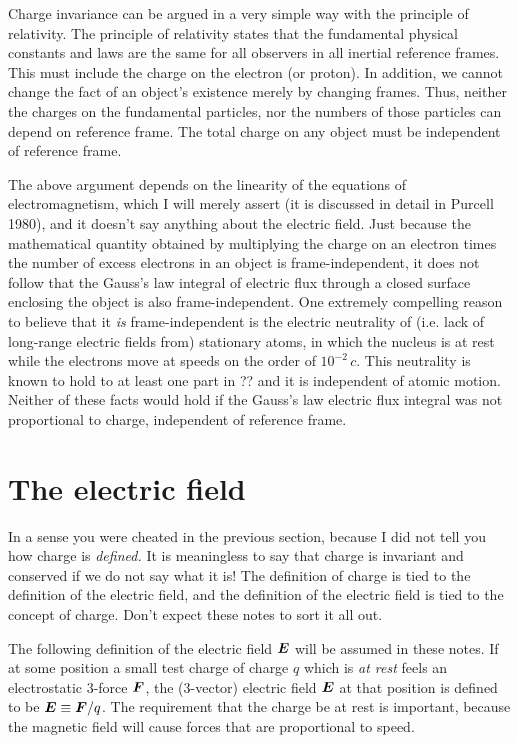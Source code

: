 Charge invariance can be argued in a very simple way with the
principle of relativity.  The principle of relativity states that the
fundamental physical constants and laws are the same for all observers
in all inertial reference frames.  This must include the charge on the
electron (or proton).  In addition, we cannot change the fact of an
object's existence merely by changing frames.  Thus, neither the
charges on the fundamental particles, nor the numbers of those
particles can depend on reference frame.  The total charge on any
object must be independent of reference frame.

The above argument depends on the linearity of the equations of
electromagnetism, which I will merely assert (it is discussed in
detail in Purcell 1980), and it doesn't say anything about the
electric field.  Just because the mathematical quantity obtained by
multiplying the charge on an electron times the number of excess
electrons in an object is frame-independent, it does not follow that
the Gauss's law integral of electric flux through a closed surface
enclosing the object is also frame-independent.  One extremely
compelling reason to believe that it {\em is} frame-independent is the
electric neutrality of (i.e. lack of long-range electric fields from)
stationary atoms, in which the nucleus is at rest while the electrons
move at speeds on the order of $10^{-2}\,c$.  This neutrality is known
to hold to at least one part in ?? and it is independent of atomic
motion.  Neither of these facts would hold if the Gauss's law electric
flux integral was not proportional to charge, independent of reference
frame.


\section{The electric field}

In a sense you were cheated in the previous section, because I did not
tell you how charge is {\em defined.}  It is meaningless to say that
charge is invariant and conserved if we do not say what it is!  The
definition of charge is tied to the definition of the electric field,
and the definition of the electric field is tied to the concept of
charge.  Don't expect these notes to sort it all out.

The following definition of the electric field $\mbox{\boldmath $E$}$ will be
assumed in these notes.  If at some position a small test charge of
charge $q$ which is {\em at rest\/} feels an electrostatic 3-force
$\mbox{\boldmath $F$}$, the (3-vector) electric field $\mbox{\boldmath $E$}$ at that position is
defined to be $\mbox{\boldmath $E$}\equiv \mbox{\boldmath $F$}/q$.  The requirement that the
charge be at rest is important, because the magnetic field will cause
forces that are proportional to speed.

